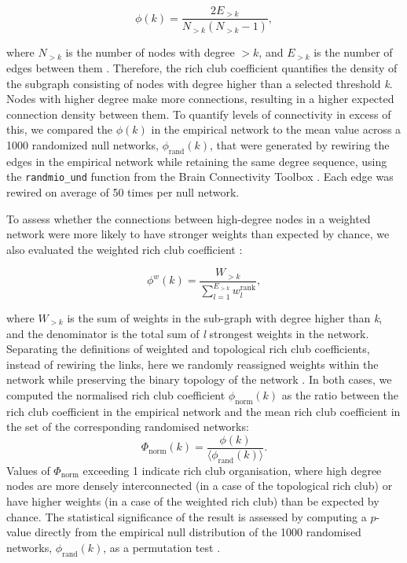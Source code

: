 \begin{equation}
    \label{eqn:Ch5Eq1}
    \phi(k) = \frac{2E_{>k}}{N_{>k}(N_{>k}-1)},
\end{equation}

where $N_{>k}$ is the number of nodes with degree $>k$, and $E_{>k}$ is the number of edges between them \citep{Colizza2006}. Therefore, the rich club coefficient quantifies the density of the subgraph consisting of nodes with degree higher than a selected threshold \textit{k}. Nodes with higher degree make more connections, resulting in a higher expected connection density between them. To quantify levels of connectivity in excess of this, we compared the $\phi(k)$ in the empirical network to the mean value across a 1000 randomized null networks, $\phi_\mathrm{rand}(k)$, that were generated by rewiring the edges in the empirical network while retaining the same degree sequence, using the \texttt{randmio\_und} function from the Brain Connectivity Toolbox \citep{Rubinov2010}. Each edge was rewired on average of 50 times per null network.

To assess whether the connections between high-degree nodes in a weighted network were more likely to have stronger weights than expected by chance, we also evaluated the weighted rich club coefficient \citep{Opsahl2008}:

\begin{equation}
    \label{eqn:Ch5Eq2}
    \phi^{w}(k) = \frac{W_{>k}}{\sum_{l=1}^{E_{>k}}w^\mathrm{rank}_{l}},
\end{equation}

where $W_{>k}$ is the sum of weights in the sub-graph with degree higher than \textit{k}, and the denominator is the total sum of \textit{l} strongest weights in the network. Separating the definitions of weighted and topological rich club coefficients, instead of rewiring the links, here we randomly reassigned weights within the network while preserving the binary topology of the network  \citep{Alstott2014}. In both cases, we computed the normalised rich club coefficient $\phi_\mathrm{norm}(k)$ as the ratio between the rich club coefficient in the empirical network and the mean rich club coefficient in the set of the corresponding randomised networks:
\begin{equation}
    \label{eqn:Ch5Eq3}
    \Phi_\mathrm{norm}(k) = \frac{\phi(k)}{\langle \phi_\mathrm{rand}(k) \rangle}.
\end{equation}
Values of $\Phi_\mathrm{norm}$ exceeding 1 indicate rich club organisation, where high degree nodes are more densely interconnected (in a case of the topological rich club) or have higher weights (in a case of the weighted rich club) than be expected by chance. The statistical significance of the result is assessed by computing a $p$-value directly from the empirical null distribution of the 1000 randomised networks, $\phi_\mathrm{rand}(k)$, as a permutation test \citep{VandenHeuvel2011}.

